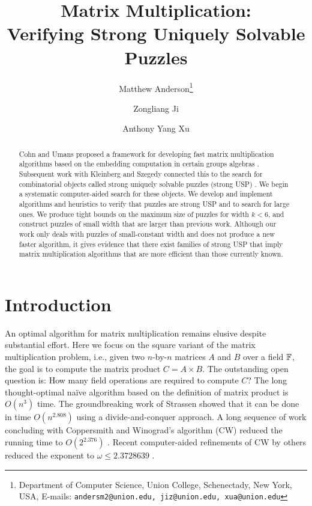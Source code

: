 \documentclass[11pt]{article}
\date{}
\title{Matrix Multiplication: \\Verifying Strong Uniquely Solvable Puzzles
}
\author{
Matthew Anderson\thanks{Department of Computer Science, Union College, Schenectady, New York, USA, E-mails: \texttt{andersm2@union.edu, jiz@union.edu, xua@union.edu}}%
\and%
Zongliang Ji\samethanks[1]
\and%
Anthony Yang Xu\samethanks[1]
}
\begin{document}
\maketitle

\begin{abstract}
Cohn and Umans proposed a framework for developing fast matrix
multiplication algorithms based on the embedding computation in
certain groups algebras \cite{cu03}.  Subsequent work with Kleinberg and
Szegedy connected this to the search for combinatorial objects called
strong uniquely solvable puzzles (strong USP) \cite{cksu05}.  We begin a
systematic computer-aided search for these objects.  We develop and
implement algorithms and heuristics to verify that puzzles are strong USP
and to search for large ones.  We produce tight bounds on the maximum
size of puzzles for width $k < 6$, and construct puzzles of small
width that are larger than previous work.  Although our work only
deals with puzzles of small-constant width and does not produce a new
faster algorithm, it gives evidence that there exist families of strong USP
that imply matrix multiplication algorithms that are more efficient
than those currently known.
\end{abstract}

\thispagestyle{empty}
\newpage
{}


\section{Introduction}
\label{sec:intro}


An optimal algorithm for matrix multiplication remains elusive
despite substantial effort.  Here we focus on the square variant of the
matrix multiplication problem, i.e., given two $n$-by-$n$ matrices
$A$ and $B$ over a field $\F$, the goal is to compute the matrix
product $C = A \times B$.  The outstanding open question is: How many field
operations are required to compute $C$?  The long thought-optimal na\"{i}ve algorithm
based on the definition of matrix product is $O(n^3)$ time.
The groundbreaking work of Strassen showed that it can
be done in time $O(n^{2.808})$ \cite{str69} using a
divide-and-conquer approach.  A long sequence of work concluding with
Coppersmith and Winograd's algorithm (CW) reduced the running time
to $O(2^{2.376})$ \cite{pan78,sch81,str86,cw90}. Recent
computer-aided refinements of CW by others reduced the
exponent to $\omega \le 2.3728639$ \cite{ds13,wil12,le14}.
\end{document}
